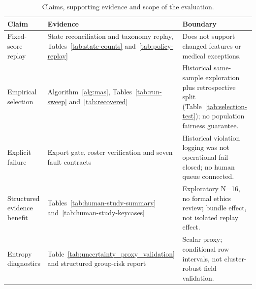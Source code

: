 \begin{table}[t]
\centering\small
\caption{Claims, supporting evidence and scope of the evaluation.}
\label{tab:claim_evidence}
\begin{tabularx}{\textwidth}{p{}XX}
\toprule
Claim & Evidence & Boundary \\
\midrule
Fixed-score replay & State reconciliation and taxonomy replay, Tables~\ref{tab:state-counts} and~\ref{tab:policy-replay} & Does not support changed features or medical exceptions. \\
Empirical selection & Algorithm~\ref{alg:mas}, Tables~\ref{tab:run-sweep} and~\ref{tab:recovered} & Historical same-sample exploration plus retrospective split (Table~\ref{tab:selection-test}); no population fairness guarantee. \\
Explicit failure & Export gate, roster verification and seven fault contracts & Historical violation logging was not operational fail-closed; no human queue connected. \\
Structured evidence benefit & Tables~\ref{tab:human-study-summary} and~\ref{tab:human-study-keycases} & Exploratory N=16, no formal ethics review; bundle effect, not isolated replay effect. \\
Entropy diagnostics & Table~\ref{tab:uncertainty_proxy_validation} and structured group-risk report & Scalar proxy; conditional row intervals, not cluster-robust field validation. \\
\bottomrule
\end{tabularx}
\end{table}
